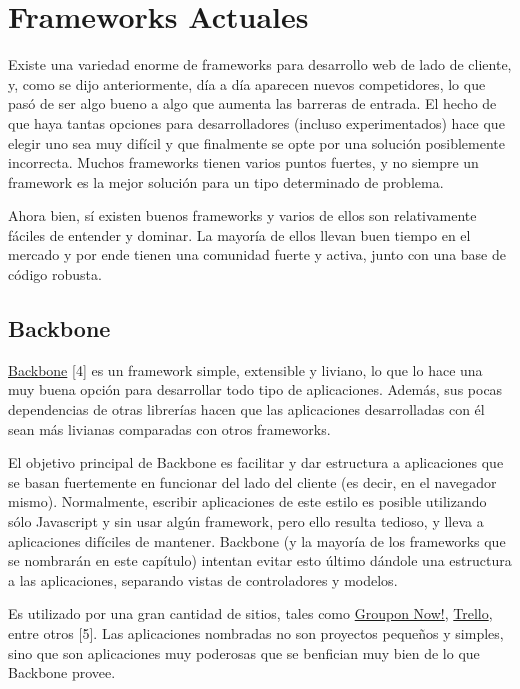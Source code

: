 \documentclass[12pt,spanish,letter]{report}
\begin{document}
\section{Frameworks Actuales}

Existe una variedad enorme de frameworks para desarrollo web de lado de
cliente, y, como se dijo anteriormente, día a día aparecen nuevos
competidores, lo que pasó de ser algo bueno a algo que aumenta las
barreras de entrada. El hecho de que haya tantas opciones para
desarrolladores (incluso experimentados) hace que elegir uno sea muy
difícil y que finalmente se opte por una solución posiblemente
incorrecta. Muchos frameworks tienen varios puntos fuertes, y no siempre
un framework es la mejor solución para un tipo determinado de problema.

Ahora bien, sí existen buenos frameworks y varios de ellos son
relativamente fáciles de entender y dominar. La mayoría de ellos llevan
buen tiempo en el mercado y por ende tienen una comunidad fuerte y
activa, junto con una base de código robusta.

\subsection{Backbone}

\label{sections:backbone}

\href{http://backbonejs.org}{Backbone} {[}4{]} es un framework simple,
extensible y liviano, lo que lo hace una muy buena opción para
desarrollar todo tipo de aplicaciones. Además, sus pocas dependencias de
otras librerías hacen que las aplicaciones desarrolladas con él sean más
livianas comparadas con otros frameworks.

El objetivo principal de Backbone es facilitar y dar estructura a
aplicaciones que se basan fuertemente en funcionar del lado del cliente
(es decir, en el navegador mismo). Normalmente, escribir aplicaciones de
este estilo es posible utilizando sólo Javascript y sin usar algún
framework, pero ello resulta tedioso, y lleva a aplicaciones difíciles
de mantener. Backbone (y la mayoría de los frameworks que se nombrarán
en este capítulo) intentan evitar esto último dándole una estructura a
las aplicaciones, separando vistas de controladores y modelos.

Es utilizado por una gran cantidad de sitios, tales como
\href{http://www.groupon.com/now}{Groupon Now!},
\href{http://trello.com}{Trello}, entre otros {[}5{]}. Las aplicaciones
nombradas no son proyectos pequeños y simples, sino que son aplicaciones
muy poderosas que se benfician muy bien de lo que Backbone provee.
\end{document}

